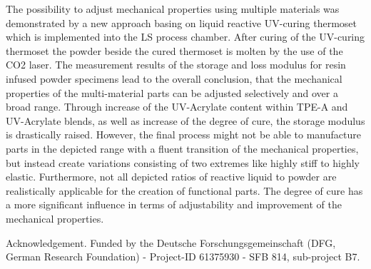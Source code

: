 \documentclass[10pt]{article}
\begin{document}
The possibility to adjust mechanical properties using multiple materials was demonstrated by a new approach basing on liquid reactive UV-curing thermoset which is implemented into the LS process chamber. After curing of the UV-curing thermoset the powder beside the cured thermoset is molten by the use of the CO2 laser. The measurement results of the storage and loss modulus for resin infused powder specimens lead to the overall conclusion, that the mechanical properties of the multi-material parts can be adjusted selectively and over a broad range. Through increase of the UV-Acrylate content within TPE-A and UV-Acrylate blends, as well as increase of the degree of cure, the storage modulus is drastically raised. However, the final process might not be able to manufacture parts in the depicted range with a fluent transition of the mechanical properties, but instead create variations consisting of two extremes like highly stiff to highly elastic. Furthermore, not all depicted ratios of reactive liquid to powder are realistically applicable for the creation of functional parts. The degree of cure has a more significant influence in terms of adjustability and improvement of the mechanical properties.

Acknowledgement. Funded by the Deutsche Forschungsgemeinschaft (DFG, German Research Foundation) - Project-ID 61375930 - SFB 814, sub-project B7.
\end{document}
